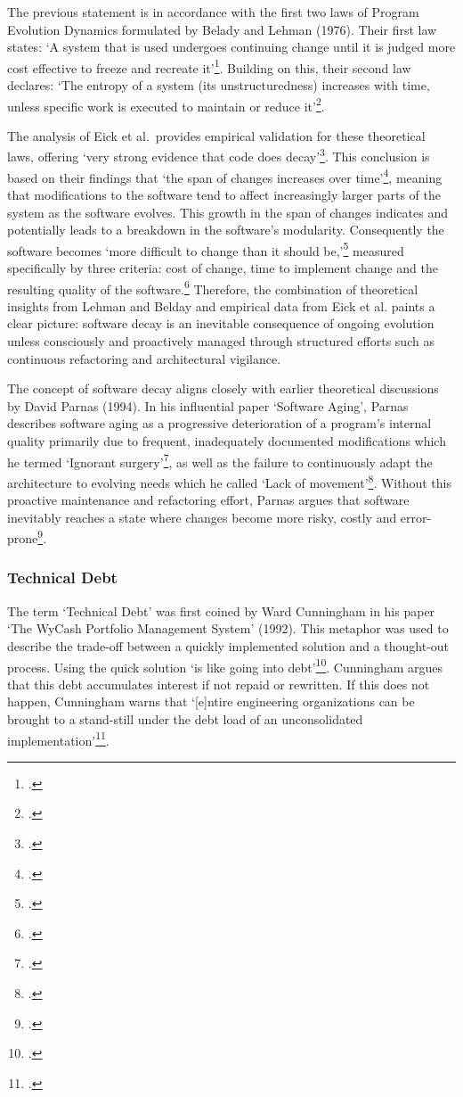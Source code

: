 The previous statement is in accordance with the first two laws of Program Evolution Dynamics formulated by Belady and Lehman (1976).
Their first law states: `A system that is used undergoes continuing change until it is judged more cost effective to freeze and recreate it'\footcite[228]{beladyModelLargeProgram1976}.
Building on this, their second law declares: `The entropy of a system (its unstructuredness) increases with time, unless specific work is executed to maintain or reduce it'\footcite[228]{beladyModelLargeProgram1976}.

The analysis of Eick et al.\ provides empirical validation for these theoretical laws, offering `very strong evidence that code does decay'\footcite[7]{eickDoesCodeDecay2001}.
This conclusion is based on their findings that `the span of changes increases over time'\footcite[7]{eickDoesCodeDecay2001}, meaning that modifications to the software tend to affect increasingly larger parts of the system as the software evolves. This growth in the span of changes indicates and potentially leads to
a breakdown in the software's modularity. Consequently the software becomes `more difficult to change than it should be,'\footcite[3]{eickDoesCodeDecay2001} measured specifically by three criteria: cost of change, time to implement change and the resulting quality of the software.\footcite[3]{eickDoesCodeDecay2001}
Therefore, the combination of theoretical insights from Lehman and Belday and empirical data from Eick et al. paints a clear picture: software decay is an inevitable consequence of ongoing evolution unless consciously and proactively managed through structured efforts such as continuous refactoring and architectural vigilance.

The concept of software decay aligns closely with earlier theoretical discussions by David Parnas (1994). In his influential paper `Software Aging', Parnas describes software aging as a progressive deterioration of a program's internal quality primarily due to frequent, 
inadequately documented modifications which he termed `Ignorant surgery'\footcite[280]{296790}, as well as the failure to continuously adapt the architecture to evolving needs which he called `Lack of movement'\footcite[280]{296790}.
Without this proactive maintenance and refactoring effort, Parnas argues that software inevitably reaches a state where changes become more risky, costly and error-prone\footcite[280-281]{296790}.

\subsubsection{Technical Debt}
The term `Technical Debt' was first coined by Ward Cunningham in his paper `The WyCash Portfolio Management System' (1992). This metaphor was used to describe the trade-off between a quickly implemented solution and a thought-out process. 
Using the quick solution `is like going into debt'\footcite[2]{cunninghamWyCashPortfolioManagement1992}. Cunningham argues that this debt accumulates interest if not repaid or rewritten. 
If this does not happen, Cunningham warns that `[e]ntire engineering organizations can be brought to a stand-still under the debt load of an unconsolidated implementation'\footcite[2]{cunninghamWyCashPortfolioManagement1992}.

